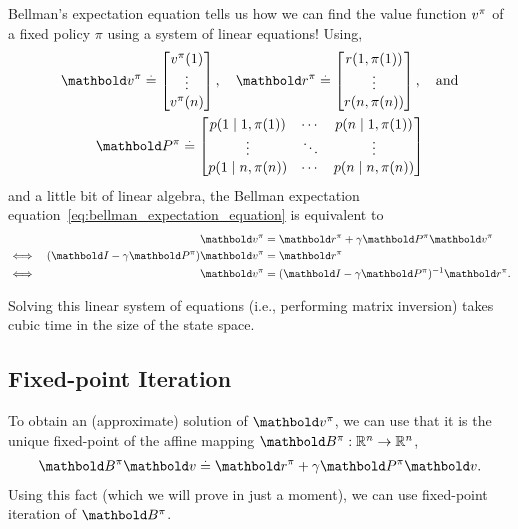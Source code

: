 Bellman's expectation equation tells us how we can find the value function $\fnv[\pi]$ of a fixed policy $\pi$ using a system of linear equations!
Using, \begin{equation}\begin{gathered}
  \vv^\pi \defeq \begin{bmatrix}
    \v[\pi]{1} \\
    \vdots \\
    \v[\pi]{n}
  \end{bmatrix}, \quad \vr^\pi \defeq \begin{bmatrix}
    r(1, \pi(1)) \\
    \vdots \\
    r(n, \pi(n))
  \end{bmatrix}, \quad\text{and} \\ \mP^\pi \defeq \begin{bmatrix}
    p(1 \mid 1, \pi(1)) & \cdots & p(n \mid 1, \pi(1)) \\
    \vdots & \ddots & \vdots \\
    p(1 \mid n, \pi(n)) & \cdots & p(n \mid n, \pi(n))
  \end{bmatrix}
\end{gathered}\end{equation} and a little bit of linear algebra, the Bellman expectation equation~\eqref{eq:bellman_expectation_equation} is equivalent to \begin{align}
  &&\vv^\pi &= \vr^\pi + \gamma \mP^\pi \vv^\pi \label{eq:bellman_expectation_equation_matrix_form} \\
  \iff &&(\mI - \gamma \mP^\pi) \vv^\pi &= \vr^\pi  \nonumber \\
  \iff &&\vv^\pi &= \inv{(\mI - \gamma \mP^\pi)} \vr^\pi.
\end{align}

Solving this linear system of equations (i.e., performing matrix inversion) takes cubic time in the size of the state space.

\subsection{Fixed-point Iteration}

To obtain an (approximate) solution of $\vv^\pi$, we can use that it is the unique fixed-point of the affine mapping $\mB^\pi : \R^n \to \R^n$, \begin{align}
  \mB^\pi \vv \defeq \vr^\pi + \gamma \mP^\pi \vv. \label{eq:value_function_fixed_point_helper}
\end{align}
Using this fact (which we will prove in just a moment), we can use fixed-point iteration of $\mB^\pi$.

